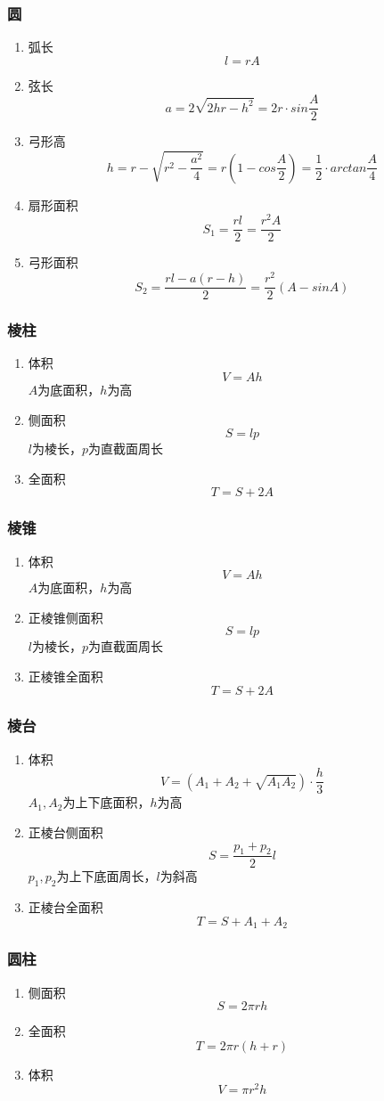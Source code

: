 \subsubsection{圆}
	\begin{enumerate}
		\item 弧长
			$$l=rA$$
		\item 弦长
			$$a=2\sqrt{2hr-h^2}=2r\cdot sin\frac{A}{2}$$
		\item 弓形高
			$$h=r-\sqrt{r^2-\frac{a^2}{4}}=r(1-cos\frac{A}{2})=\frac{1}{2} \cdot arctan\frac{A}{4}$$
		\item 扇形面积
			$$S_1=\frac{rl}{2}=\frac{r^2A}{2}$$
		\item 弓形面积
			$$S_2=\frac{rl-a(r-h)}{2}=\frac{r^2}{2}(A-sinA)$$
	\end{enumerate}
\subsubsection{棱柱}
	\begin{enumerate}
		\item 体积
			$$V=Ah$$
			$A$为底面积，$h$为高
		\item 侧面积
			$$S=lp$$
			$l$为棱长，$p$为直截面周长
		\item 全面积
			$$T=S+2A$$
	\end{enumerate}
\subsubsection{棱锥}
	\begin{enumerate}
		\item 体积
			$$V=Ah$$
			$A$为底面积，$h$为高
		\item 正棱锥侧面积
			$$S=lp$$
			$l$为棱长，$p$为直截面周长
		\item 正棱锥全面积
			$$T=S+2A$$
	\end{enumerate}
\subsubsection{棱台}
	\begin{enumerate}
		\item 体积
			$$V=(A_1+A_2+\sqrt{A_1A_2}) \cdot \frac{h}{3}$$
			$A_1,A_2$为上下底面积，$h$为高
		\item 正棱台侧面积
			$$S=\frac{p_1+p_2}{2}l$$
			$p_1,p_2$为上下底面周长，$l$为斜高
		\item 正棱台全面积
			$$T=S+A_1+A_2$$
	\end{enumerate}
\subsubsection{圆柱}
	\begin{enumerate}
		\item 侧面积
			$$S=2\pi rh$$
		\item 全面积
			$$T=2\pi r(h+r)$$
		\item 体积
			$$V=\pi r^2h$$
	\end{enumerate}
